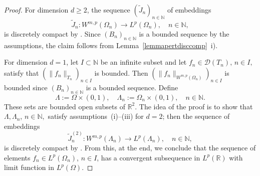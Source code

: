 \documentclass[a4paper,reqno]{amsart}
\begin{document}
\begin{proof}
For dimension $d\geq 2$, the sequence $(\widetilde J_n)_{n\in{\mathbb{N}}}$ of embeddings
$$\widetilde J_n: W^{m,p}(\Omega_n)\to L^p(\Omega_n), \quad n\in{\mathbb{N}},$$
 is discretely compact by \cite[Satz 4.(9)]{grigorieffsobolev}. 
Since $(B_n)_{n\in{\mathbb{N}}}$ is a bounded sequence by the assumptions,
the claim follows from Lemma~\ref{lemmapertdisccomp}~i). 

For dimension $d=1$, let $I\subset{\mathbb{N}}$ be an infinite subset and let $f_n\in{\mathcal D}(T_n), \,n\in I,$ satisfy that $\left(\|f_n\|_{T_n}\right)_{n\in I}$ is bounded. Then $\left(\|f_n\|_{W^{m,p}(\Omega_n)}\right)_{n\in I}$ is bounded since $(B_n)_{n\in{\mathbb{N}}}$ is a bounded sequence.
 Define $$\Lambda:=\Omega\times(0,1), \quad \Lambda_n:=\Omega_n\times(0,1), \quad n\in{\mathbb{N}}.$$
These sets are bounded open  subsets of ${\mathbb{R}}^2$.
The idea of the proof is to show that $\Lambda, \Lambda_n$, $n\in{\mathbb{N}},$ satisfy assumptions~(i)--(iii) for $d=2$;
then the sequence of embeddings 
\begin{equation} \widetilde J_n^{(2)}: W^{m,p}(\Lambda_n)\to L^p(\Lambda_n), \quad n\in{\mathbb{N}},\label{eq.sobolevd2}\end{equation}
 is discretely compact by  \cite[Satz 4.(9)]{grigorieffsobolev}.
From this, at the end, we conclude that the sequence of elements $f_n\in L^p(\Omega_n)$, $n\in I$, has a convergent subsequence in $L^p({\mathbb{R}})$ with limit function in $L^p(\Omega)$.


\end{proof}
\end{document}
